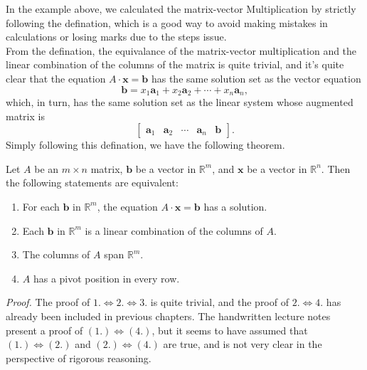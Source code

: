 \documentclass[10pt, a4paper]{article}
\begin{document}
\indent In the example above, we calculated the matrix-vector Multiplication by strictly following the defination, which is a good way to avoid making mistakes in calculations or losing marks due to the steps issue. \\
\indent From the defination, the equivalance of the matrix-vector multiplication and the linear combination of the columns of the matrix is quite trivial, and it's quite clear that the equation $A\cdot \mathbf{x}=\mathbf{b}$ has the same solution set as the vector equation $$\mathbf{b}=x_1 \mathbf{a}_1+x_2 \mathbf{a}_2+\cdots+x_n \mathbf{a}_n,$$ which, in turn, has the same solution set as the linear system whose augmented matrix is $$\begin{bmatrix} \mathbf{a}_1 & \mathbf{a}_2 & \cdots & \mathbf{a}_n & \mathbf{b} \end{bmatrix}.$$
Simply following this defination, we have the following theorem.
\begin{proposition}
    Let $A$ be an $m\times n$ matrix, $\mathbf{b}$ be a vector in $\mathbb{R}^m$, and $\mathbf{x}$ be a vector in $\mathbb{R}^n$. Then the following statements are equivalent:
    \begin{enumerate}
        \item For each $\mathbf{b}$ in $\mathbb{R}^m$, the equation $A\cdot \mathbf{x}=\mathbf{b}$ has a solution.
        \item Each $\mathbf{b}$ in $\mathbb{R}^m$ is a linear combination of the columns of $A$.
        \item The columns of $A$ span $\mathbb{R}^m$.
        \item $A$ has a pivot position in every row.
    \end{enumerate}
\end{proposition}
\indent \textit{Proof.} The proof of $1. \iff 2. \iff 3.$ is quite trivial, and the proof of $2. \iff 4.$ has already been included in previous chapters. The handwritten lecture notes present a proof of $(1.) \iff (4.)$, but it seems to have assumed that $(1.)\iff(2.)$ and $(2.)\iff(4.)$ are true, and is not very clear in the perspective of rigorous reasoning.\\
\end{document}
